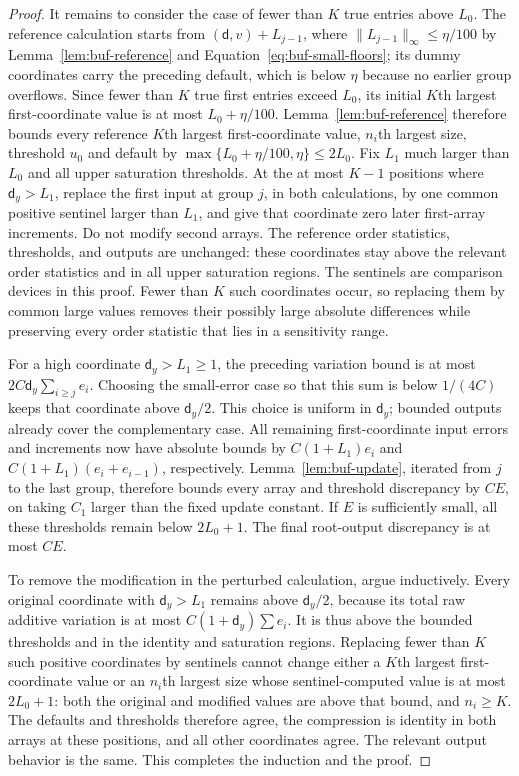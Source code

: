 \begin{proof}
It remains to consider the case of fewer than $K$ true entries above
$L_0$.  The reference calculation starts from $(\mathsf{d},v)+L_{j-1}$, where
$\|L_{j-1}\|_\infty\le\eta/100$ by Lemma~\ref{lem:buf-reference} and
Equation~\eqref{eq:buf-small-floors}; its dummy coordinates carry the
preceding default, which is below $\eta$ because no earlier group
overflows.  Since fewer than $K$ true first entries exceed $L_0$, its
initial $K$th largest first-coordinate value is at most $L_0+\eta/100$.
Lemma~\ref{lem:buf-reference} therefore bounds every reference $K$th largest first-coordinate value, $n_i$th largest size, threshold $u_0$ and default by
$\max\{L_0+\eta/100,\eta\}\le2L_0$.  Fix $L_1$ much larger than $L_0$ and all upper
saturation thresholds.  At the at most $K-1$ positions where $\mathsf{d}_y>L_1$,
replace the first input at group $j$, in both calculations, by one common
positive sentinel larger than $L_1$, and give that coordinate zero later
first-array increments.  Do not modify second arrays.
The reference order statistics, thresholds, and outputs are unchanged: these
coordinates stay above the relevant order statistics and in all upper saturation
regions.
The sentinels are comparison devices in this proof.  Fewer than $K$ such
coordinates occur, so replacing them by common large values removes
their possibly large absolute differences while preserving every order statistic
that lies in a sensitivity range.

For a high coordinate $\mathsf{d}_y>L_1\ge1$, the preceding variation bound
is at most $2C \mathsf{d}_y\sum_{i\ge j}e_i$. Choosing the small-error
case so that this sum is below $1/(4C)$ keeps that coordinate
above $\mathsf{d}_y/2$. This choice is uniform in $\mathsf{d}_y$; bounded outputs
already cover the complementary case. All remaining
first-coordinate input errors and increments now have
absolute bounds by $C(1+L_1)e_i$ and
$C(1+L_1)(e_i+e_{i-1})$, respectively.  Lemma~\ref{lem:buf-update},
iterated from $j$ to the last group, therefore bounds every array and
threshold discrepancy by $CE$, on taking $C_1$ larger than the fixed
update constant.  If $E$ is sufficiently small, all these thresholds
remain below $2L_0+1$.  The final root-output discrepancy is at most $CE$.

To remove the modification in the perturbed calculation, argue inductively.
Every original coordinate with $\mathsf{d}_y>L_1$ remains above $\mathsf{d}_y/2$, because
its total raw additive variation is at most $C(1+\mathsf{d}_y)\sum e_i$.
It is thus above the bounded thresholds and in the identity and saturation
regions.  Replacing fewer than $K$ such positive coordinates by sentinels
cannot change either a $K$th largest first-coordinate value or an $n_i$th largest size whose
sentinel-computed value is at most $2L_0+1$: both the original and modified
values are above that bound, and $n_i\geq K$.
The defaults and thresholds therefore agree, the compression is identity
in both arrays at these positions, and all other coordinates agree.
The relevant output behavior is the same.  This completes the induction
and the proof.
\end{proof}

